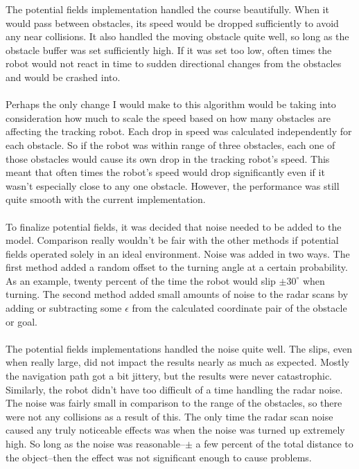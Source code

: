 \documentclass{aiaa-tc}%
\begin{document}
The potential fields implementation handled the course beautifully. When it would pass between obstacles, its speed would be dropped sufficiently to avoid any near collisions. It also handled the moving obstacle quite well, so long as the obstacle buffer was set sufficiently high. If it was set too low, often times the robot would not react in time to sudden directional changes from the obstacles and would be crashed into. \\ \\
Perhaps the only change I would make to this algorithm would be taking into consideration how much to scale the speed based on how many obstacles are affecting the tracking robot. Each drop in speed was calculated independently for each obstacle. So if the robot was within range of three obstacles, each one of those obstacles would cause its own drop in the tracking robot's speed. This meant that often times the robot's speed would drop significantly even if it wasn't especially close to any one obstacle. However, the performance was still quite smooth with the current implementation. \\ \\
To finalize potential fields, it was decided that noise needed to be added to the model. Comparison really wouldn't be fair with the other methods if potential fields operated solely in an ideal environment. Noise was added in two ways. The first method added a random offset to the turning angle at a certain probability. As an example, twenty percent of the time the robot would slip $\pm 30^{\circ}$ when turning. The second method added small amounts of noise to the radar scans by adding or subtracting some $\epsilon$ from the calculated coordinate pair of the obstacle or goal. \\ \\
The potential fields implementations handled the noise quite well. The slips, even when really large, did not impact the results nearly as much as expected. Mostly the navigation path got a bit jittery, but the results were never catastrophic. Similarly, the robot didn't have too difficult of a time handling the radar noise. The noise was fairly small in comparison to the range of the obstacles, so there were not any collisions as a result of this. The only time the radar scan noise caused any truly noticeable effects was when the noise was turned up extremely high. So long as the noise was reasonable--$\pm$ a few percent of the total distance to the object--then the effect was not significant enough to cause problems.
\end{document}
